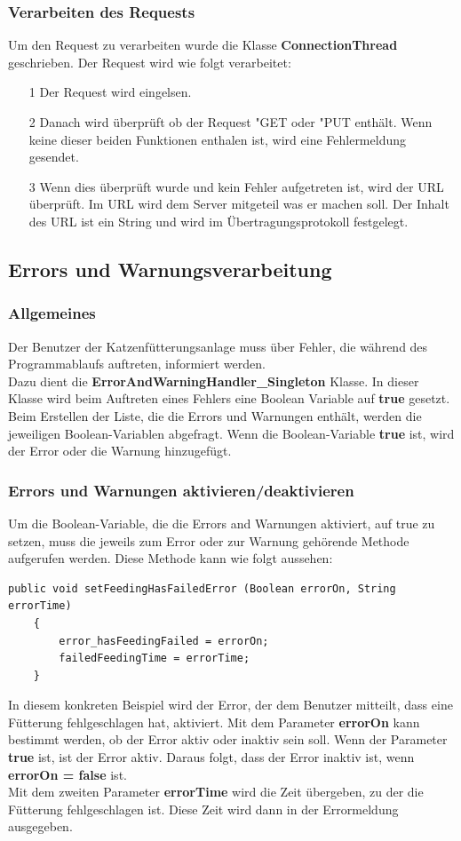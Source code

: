 \subsubsection{Verarbeiten des Requests}
Um den Request zu verarbeiten wurde die Klasse \textbf{ConnectionThread} geschrieben. Der Request wird wie folgt verarbeitet:
\begin{itemize}
\item[1] Der Request wird eingelsen.
\item[2] Danach wird überprüft ob der Request "GET\grqq{} oder "PUT\grqq{} enthält. Wenn keine dieser beiden Funktionen enthalen ist, wird eine Fehlermeldung gesendet.
\item[3] Wenn dies überprüft wurde und kein Fehler aufgetreten ist, wird der URL überprüft. Im URL wird dem Server mitgeteil was er machen soll. Der Inhalt des URL ist ein String und wird im Übertragungsprotokoll festgelegt.
\end{itemize}

\subsection{Errors und Warnungsverarbeitung}
\subsubsection{Allgemeines}
Der Benutzer der Katzenfütterungsanlage muss über Fehler, die während des Programmablaufs auftreten, informiert werden. 
\\ Dazu dient die \textbf{ErrorAndWarningHandler\_Singleton} Klasse. In dieser Klasse wird beim Auftreten eines Fehlers eine Boolean Variable auf \textbf{true} gesetzt. Beim Erstellen der Liste, die die Errors und Warnungen enthält, werden die jeweiligen Boolean-Variablen abgefragt. Wenn die Boolean-Variable \textbf{true} ist, wird der Error oder die Warnung hinzugefügt. 

\newpage

\subsubsection{Errors und Warnungen aktivieren/deaktivieren}
Um die Boolean-Variable, die die Errors and Warnungen aktiviert, auf true zu setzen, muss die jeweils zum Error oder zur Warnung gehörende Methode aufgerufen werden. Diese Methode kann wie folgt aussehen:
\begin{lstlisting}[style=JavaStyle]
public void setFeedingHasFailedError (Boolean errorOn, String errorTime)
    {
        error_hasFeedingFailed = errorOn;
        failedFeedingTime = errorTime;
    }
\end{lstlisting}
In diesem konkreten Beispiel wird der Error, der dem Benutzer mitteilt, dass eine Fütterung fehlgeschlagen hat, aktiviert. Mit dem Parameter \textbf{errorOn} kann bestimmt werden, ob der Error aktiv oder inaktiv sein soll. Wenn der Parameter \textbf{true} ist, ist der Error aktiv. Daraus folgt, dass der Error inaktiv ist, wenn \textbf{errorOn = false} ist. 
\\ Mit dem zweiten Parameter \textbf{errorTime} wird die Zeit übergeben, zu der die Fütterung fehlgeschlagen ist. Diese Zeit wird dann in der Errormeldung ausgegeben. 

